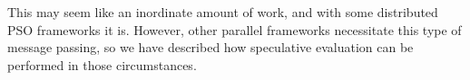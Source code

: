 \documentclass[smallcondensed]{svjour3}
\begin{document}
This may seem like an inordinate amount of work, and with some distributed PSO
frameworks it is.  However, other parallel frameworks necessitate this type of
message passing, so we have described how speculative evaluation can be
performed in those circumstances.




\end{document}
